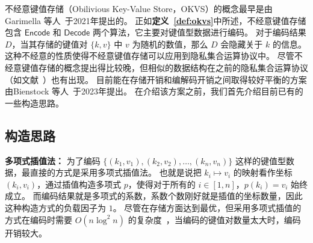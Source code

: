 不经意键值存储（Obilivious Key-Value Store，OKVS）的概念最早是由 Garimella 等人~\cite{garimella2021oblivious}于2021年提出的。
正如\textbf{定义~\ref{def:okvs}}中所述，不经意键值存储包含 $\mathsf{Encode}$ 和 $\mathsf{Decode}$ 两个算法，它主要对键值型数据进行编码。
对于编码结果 $D$，当其存储的键值对 $\{k, v\}$ 中 $v$ 为随机的数值，那么 $D$ 会隐藏关于 $k$ 的信息。
这种不经意的性质使得不经意键值存储可以应用到隐私集合运算协议中。
尽管不经意键值存储的概念提出得比较晚，但相似的数据结构在之前的隐私集合运算协议（如文献~\cite{dong2013when,pinkas2020psi}）也有出现。
目前能在存储开销和编解码开销之间取得较好平衡的方案由Bienstock 等人~\cite{bienstock2023NearOptimal}于2023年提出。
在介绍该方案之前，我们首先介绍目前已有的一些构造思路。

\subsection{构造思路}

\textbf{多项式插值法：}
为了编码 $\{(k_1, v_1), (k_2, v_2), \dots, (k_n, v_n)\}$ 这样的键值型数据，最直接的方式是采用多项式插值法。
也就是说把 $k_i \mapsto v_i$ 的映射看作坐标 $(k_i, v_i)$，通过插值构造多项式 $p$，使得对于所有的 $i\in[1,n]$，$p(k_i) = v_i$ 始终成立。
而编码结果就是多项式的系数，系数个数刚好就是插值的坐标数量，因此这种构造方式的负载因子为 $1$。
尽管在存储方面达到最优，但采用多项式插值的方式在编码时需要 $O(n\log^2n)$ 的复杂度~\cite{moenck1972Fast}，当编码的键值对数量太大时，编码开销较大。

